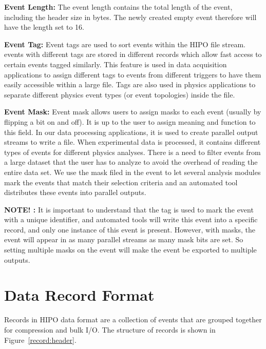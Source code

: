 \documentclass[preprint,12pt]{elsarticle}
\begin{document}
{\bf Event Length:} The event length contains the total length of the event, including the header size in bytes. 
 The newly created empty event therefore will have the length set to 16.
 
 {\bf Event Tag:} Event tags are used to sort events within the HIPO file stream. events with different tags are stored
 in different records which allow fast access to certain events tagged similarly. This feature is used in data acquisition applications
 to assign different tags to events from different triggers to have them easily accessible within a large file. Tags are also used in 
 physics applications to separate different physics event types (or event topologies) inside the file.
 
{\bf Event Mask:} Event mask allows users to assign masks to each event (usually by flipping a bit on and off). It is up to the user 
to assign meaning and function to this field. In our data processing applications, it is used to create parallel output streams to write 
a file. When experimental data is processed, it contains different types of events for different physics analyses. There is a need 
to filter events from a large dataset that the user has to analyze to avoid the overhead of reading the entire data set. We use the mask 
filed in the event to let several analysis modules mark the events that match their selection criteria and an automated tool distributes 
these events into parallel outputs.

{\bf NOTE! : } It is important to understand that the tag is used to mark the event with a unique identifier, and automated tools will write 
this event into a specific record, and only one instance of this event is present. However, with masks, the event will appear in as many 
parallel streams as many mask bits are set. So setting multiple masks on the event will make the event be exported to multiple 
outputs.

\section{Data Record Format}

Records in HIPO data format are a collection of events that are grouped together for compression and bulk I/O.
The structure of records is shown in Figure~\ref{record:header}.
\end{document}

